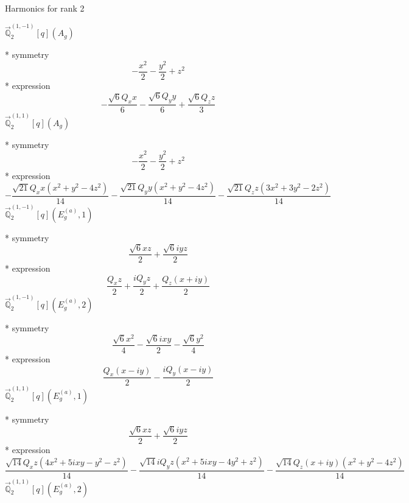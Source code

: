 \documentclass[fleqn,8pt]{jsarticle}
\begin{document}
\noindent * Harmonics for rank 2

\noindent\quad $\vec{\mathbb{Q}}_{2}^{(1,-1)}[q](A_{g})$

\noindent\quad ** symmetry
\begin{dmath*}
- \frac{x^{2}}{2} - \frac{y^{2}}{2} + z^{2}
\end{dmath*}
\noindent\quad ** expression
\begin{dmath*}
- \frac{\sqrt{6} Q_{x} x}{6} - \frac{\sqrt{6} Q_{y} y}{6} + \frac{\sqrt{6} Q_{z} z}{3}
\end{dmath*}
\noindent\quad $\vec{\mathbb{Q}}_{2}^{(1,1)}[q](A_{g})$

\noindent\quad ** symmetry
\begin{dmath*}
- \frac{x^{2}}{2} - \frac{y^{2}}{2} + z^{2}
\end{dmath*}
\noindent\quad ** expression
\begin{dmath*}
- \frac{\sqrt{21} Q_{x} x \left(x^{2} + y^{2} - 4 z^{2}\right)}{14} - \frac{\sqrt{21} Q_{y} y \left(x^{2} + y^{2} - 4 z^{2}\right)}{14} - \frac{\sqrt{21} Q_{z} z \left(3 x^{2} + 3 y^{2} - 2 z^{2}\right)}{14}
\end{dmath*}
\noindent\quad $\vec{\mathbb{Q}}_{2}^{(1,-1)}[q](E_{g}^{(a)},1)$

\noindent\quad ** symmetry
\begin{dmath*}
\frac{\sqrt{6} x z}{2} + \frac{\sqrt{6} i y z}{2}
\end{dmath*}
\noindent\quad ** expression
\begin{dmath*}
\frac{Q_{x} z}{2} + \frac{i Q_{y} z}{2} + \frac{Q_{z} \left(x + i y\right)}{2}
\end{dmath*}
\noindent\quad $\vec{\mathbb{Q}}_{2}^{(1,-1)}[q](E_{g}^{(a)},2)$

\noindent\quad ** symmetry
\begin{dmath*}
\frac{\sqrt{6} x^{2}}{4} - \frac{\sqrt{6} i x y}{2} - \frac{\sqrt{6} y^{2}}{4}
\end{dmath*}
\noindent\quad ** expression
\begin{dmath*}
\frac{Q_{x} \left(x - i y\right)}{2} - \frac{i Q_{y} \left(x - i y\right)}{2}
\end{dmath*}
\noindent\quad $\vec{\mathbb{Q}}_{2}^{(1,1)}[q](E_{g}^{(a)},1)$

\noindent\quad ** symmetry
\begin{dmath*}
\frac{\sqrt{6} x z}{2} + \frac{\sqrt{6} i y z}{2}
\end{dmath*}
\noindent\quad ** expression
\begin{dmath*}
\frac{\sqrt{14} Q_{x} z \left(4 x^{2} + 5 i x y - y^{2} - z^{2}\right)}{14} - \frac{\sqrt{14} i Q_{y} z \left(x^{2} + 5 i x y - 4 y^{2} + z^{2}\right)}{14} - \frac{\sqrt{14} Q_{z} \left(x + i y\right) \left(x^{2} + y^{2} - 4 z^{2}\right)}{14}
\end{dmath*}
\noindent\quad $\vec{\mathbb{Q}}_{2}^{(1,1)}[q](E_{g}^{(a)},2)$
\end{document}
